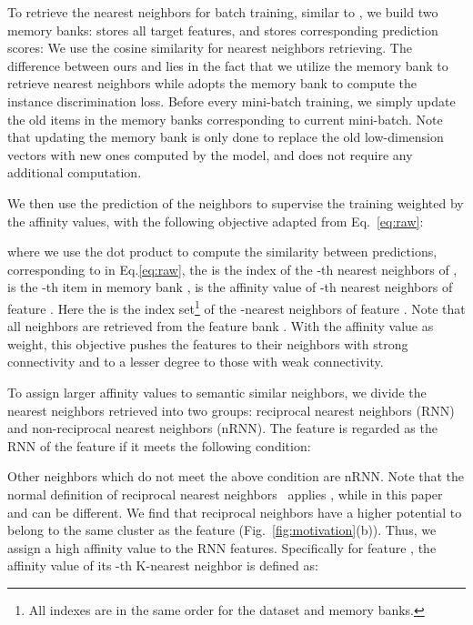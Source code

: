 \documentclass{article}
\begin{document}
To retrieve the nearest neighbors for batch training, similar to \cite{saito2020universal,wu2018unsupervised,zhuang2019local}, we build two memory banks:  stores all target features, and  stores corresponding prediction scores: 
We use the cosine similarity for nearest neighbors retrieving. The difference between ours and \cite{saito2020universal,wu2018unsupervised} lies in the fact that we utilize the memory bank to retrieve nearest neighbors while \cite{saito2020universal,wu2018unsupervised} adopts the memory bank to compute the instance discrimination loss. Before every mini-batch training, we simply update the old items in the memory banks corresponding to current mini-batch. Note that updating the memory bank is only done to replace the old low-dimension vectors with new ones computed by the model, and does not require any additional computation.

We then use the prediction of the neighbors to supervise the training weighted by the affinity values, with the following objective adapted from Eq.~\ref{eq:raw}:

where we use the dot product to compute the similarity between predictions, corresponding to  in Eq.\ref{eq:raw}, the  is the index of the -th nearest neighbors of ,  is the -th item in memory bank ,  is the affinity value of -th nearest neighbors of feature . Here the  is the index set\footnote{All indexes are in the same order for the dataset and memory banks.} of the -nearest neighbors of feature . Note that all neighbors are retrieved from the feature bank . With the affinity value as weight, this objective pushes the features to their neighbors with strong connectivity and to a lesser degree to those with weak connectivity. 

To assign larger affinity values to semantic similar neighbors, we divide the nearest neighbors retrieved into two groups: reciprocal nearest neighbors (RNN) and non-reciprocal nearest neighbors (nRNN). The feature  is regarded as the RNN of the feature  if it meets the following condition:

Other neighbors which do not meet the above condition are nRNN. Note that the normal definition of reciprocal nearest neighbors~\cite{qin2011hello} applies , while in this paper  and  can be different.
We find that reciprocal neighbors have a higher potential to belong to the same cluster as the feature (Fig.~\ref{fig:motivation}(b)). Thus, we assign a high affinity value to the RNN features. Specifically for feature , the affinity value of its -th K-nearest neighbor is defined as:
\end{document}
